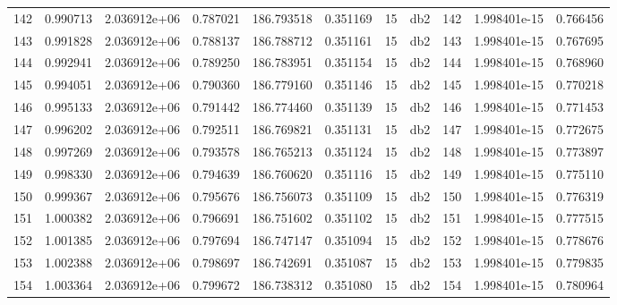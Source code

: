 \begin{tabular}{lrrrrrrlrrr}
142  &    0.990713 &        2.036912e+06 &  0.787021 &              186.793518 &    0.351169 &      15 &          db2 &    142 &   1.998401e-15 &      0.766456 \\
143  &    0.991828 &        2.036912e+06 &  0.788137 &              186.788712 &    0.351161 &      15 &          db2 &    143 &   1.998401e-15 &      0.767695 \\
144  &    0.992941 &        2.036912e+06 &  0.789250 &              186.783951 &    0.351154 &      15 &          db2 &    144 &   1.998401e-15 &      0.768960 \\
145  &    0.994051 &        2.036912e+06 &  0.790360 &              186.779160 &    0.351146 &      15 &          db2 &    145 &   1.998401e-15 &      0.770218 \\
146  &    0.995133 &        2.036912e+06 &  0.791442 &              186.774460 &    0.351139 &      15 &          db2 &    146 &   1.998401e-15 &      0.771453 \\
147  &    0.996202 &        2.036912e+06 &  0.792511 &              186.769821 &    0.351131 &      15 &          db2 &    147 &   1.998401e-15 &      0.772675 \\
148  &    0.997269 &        2.036912e+06 &  0.793578 &              186.765213 &    0.351124 &      15 &          db2 &    148 &   1.998401e-15 &      0.773897 \\
149  &    0.998330 &        2.036912e+06 &  0.794639 &              186.760620 &    0.351116 &      15 &          db2 &    149 &   1.998401e-15 &      0.775110 \\
150  &    0.999367 &        2.036912e+06 &  0.795676 &              186.756073 &    0.351109 &      15 &          db2 &    150 &   1.998401e-15 &      0.776319 \\
151  &    1.000382 &        2.036912e+06 &  0.796691 &              186.751602 &    0.351102 &      15 &          db2 &    151 &   1.998401e-15 &      0.777515 \\
152  &    1.001385 &        2.036912e+06 &  0.797694 &              186.747147 &    0.351094 &      15 &          db2 &    152 &   1.998401e-15 &      0.778676 \\
153  &    1.002388 &        2.036912e+06 &  0.798697 &              186.742691 &    0.351087 &      15 &          db2 &    153 &   1.998401e-15 &      0.779835 \\
154  &    1.003364 &        2.036912e+06 &  0.799672 &              186.738312 &    0.351080 &      15 &          db2 &    154 &   1.998401e-15 &      0.780964 \\

\end{tabular}
